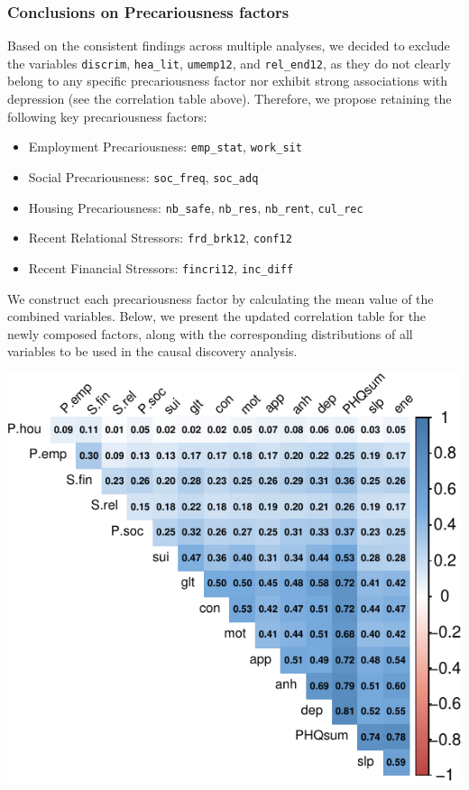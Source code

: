 \documentclass[
]{article}
\providecommand{\tightlist}{%
  \setlength{\itemsep}{0pt}\setlength{\parskip}{0pt}}\usepackage{longtable,booktabs,array}
\begin{document}
\subsubsection{Conclusions on Precariousness
factors}\label{conclusions-on-precariousness-factors}

Based on the consistent findings across multiple analyses, we decided to
exclude the variables \texttt{discrim}, \texttt{hea\_lit},
\texttt{umemp12}, and \texttt{rel\_end12}, as they do not clearly belong
to any specific precariousness factor nor exhibit strong associations
with depression (see the correlation table above). Therefore, we propose
retaining the following key precariousness factors:

\begin{itemize}
\tightlist
\item
  Employment Precariousness: \texttt{emp\_stat}, \texttt{work\_sit}
\item
  Social Precariousness: \texttt{soc\_freq}, \texttt{soc\_adq}
\item
  Housing Precariousness: \texttt{nb\_safe}, \texttt{nb\_res},
  \texttt{nb\_rent}, \texttt{cul\_rec}
\item
  Recent Relational Stressors: \texttt{frd\_brk12}, \texttt{conf12}
\item
  Recent Financial Stressors: \texttt{fincri12}, \texttt{inc\_diff}
\end{itemize}

We construct each precariousness factor by calculating the mean value of
the combined variables. Below, we present the updated correlation table
for the newly composed factors, along with the corresponding
distributions of all variables to be used in the causal discovery
analysis.

\begin{center}
\includegraphics{draft_v2_files/figure-pdf/unnamed-chunk-21-1.pdf}
\end{center}
\end{document}

